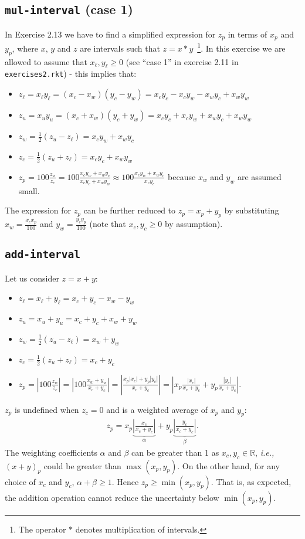 \documentclass[12pt,a4paper]{article}
\newcommand\cc[1]{\texttt{#1}}
\newcommand{\abs}[1]{\left|#1\right|}
\begin{document}
\subsection{\cc{mul-interval} (case 1)}

In Exercise 2.13 we have to find a simplified expression for $z_p$ in terms of $x_p$ and
$y_p$, where $x$, $y$ and $z$ are intervals such that $z = x * y$~\footnote{The operator
$*$ denotes multiplication of intervals.}. In this exercise we are allowed to assume
that $x_{\ell}, y_{\ell} \geq 0$ (see ``case 1'' in exercise 2.11 in
\cc{exercises2.rkt}) - this implies that:
\begin{itemize}
\item $z_{\ell} = x_{\ell} y_{\ell} = (x_c - x_w)(y_c - y_w) = x_cy_c - x_cy_w - x_wy_c + x_wy_w$
\item $z_{u} = x_{u} y_{u} = (x_c + x_w)(y_c + y_w) = x_cy_c + x_cy_w + x_wy_c + x_wy_w$
\item $z_w = \frac{1}{2}(z_u - z_{\ell}) = x_cy_w + x_wy_c$
\item $z_c = \frac{1}{2}(z_u + z_{\ell}) = x_cy_c + x_wy_w$
\item $z_p = 100\frac{z_w}{z_c} = 100\frac{x_cy_w + x_wy_c}{x_cy_c + x_wy_w} \approx 100\frac{x_cy_w + x_wy_c}{x_cy_c}$ because $x_w$ and $y_w$ are assumed small.
\end{itemize}
The expression for $z_p$ can be further reduced to $z_p = x_p + y_p$ by substituting
$x_w = \frac{x_cx_p}{100}$ and $y_w = \frac{y_cy_p}{100}$ (note that $x_c, y_c \geq 0$
by assumption).

\subsection{\cc{add-interval}}

Let us consider $z = x + y$:
\begin{itemize}
\item $z_{\ell} = x_{\ell} + y_{\ell} = x_c + y_c - x_w - y_w$
\item $z_{u} = x_{u} + y_{u} = x_c + y_c + x_w + y_w$
\item $z_w = \frac{1}{2}(z_u - z_{\ell}) = x_w + y_w$
\item $z_c = \frac{1}{2}(z_u + z_{\ell}) = x_c + y_c$
\item $z_p = \abs{100\frac{z_w}{z_c}} = \abs{100\frac{x_w + y_w}{x_c + y_c}} =
  \abs{\frac{x_p\abs{x_c} + y_p\abs{y_c}}{x_c + y_c}} = \abs{x_p\frac{\abs{x_c}}{x_c +
      y_c} + y_p\frac{\abs{y_c}}{x_c + y_c}}$.
\end{itemize}
$z_p$ is undefined when $z_c = 0$ and is a weighted average of $x_p$ and $y_p$:
\begin{align*}
  z_p =
  x_p\underbrace{\abs{\frac{x_c}{x_c + y_c}}}_{\alpha} +
  y_p\underbrace{\abs{\frac{y_c}{x_c + y_c}}}_{\beta}.
\end{align*}
The weighting coefficients $\alpha$ and $\beta$ can be greater than 1 as $x_c,
y_c\in\mathbb{R}$, \emph{i.e.,} $(x+y)_p$ could be greater than $\max(x_p, y_p)$. On the
other hand, for any choice of $x_c$ and $y_c$, $\alpha + \beta \geq 1$. Hence $z_p \geq
\min(x_p, y_p)$. That is, as expected, the addition operation cannot reduce the
uncertainty below $\min(x_p, y_p)$.
\end{document}
